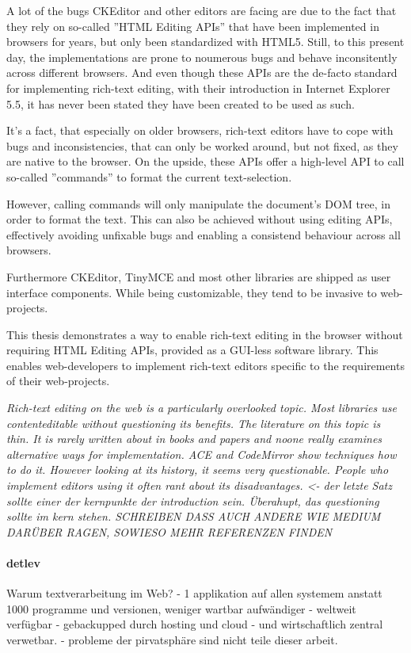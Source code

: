 A lot of the bugs CKEditor and other editors are facing are due to the fact that they rely on so-called ''HTML Editing APIs'' that have been implemented in browsers for years, but only been standardized with HTML5. Still, to this present day, the implementations are prone to noumerous bugs and behave inconsitently across different browsers. And even though these APIs are the de-facto standard for implementing rich-text editing, with their introduction in Internet Explorer 5.5, it has never been stated they have been created to be used as such.

It's a fact, that especially on older browsers, rich-text editors have to cope with bugs and inconsistencies, that can only be worked around, but not fixed, as they are native to the browser. On the upside, these APIs offer a high-level API to call so-called ''commands'' to format the current text-selection. 

However, calling commands will only manipulate the document's DOM tree, in order to format the text. This can also be achieved without using editing APIs, effectively avoiding unfixable bugs and enabling a consistend behaviour across all browsers.

Furthermore CKEditor, TinyMCE and most other libraries are shipped as user interface components. While being customizable, they tend to be invasive to web-projects.

This thesis demonstrates a way to enable rich-text editing in the browser without requiring HTML Editing APIs, provided as a GUI-less software library. This enables web-developers to implement rich-text editors specific to the requirements of their web-projects.

\textit{Rich-text editing on the web is a particularly overlooked topic. Most libraries use contenteditable without questioning its benefits. The literature on this topic is thin. It is rarely written about in books and papers and noone really examines alternative ways for implementation. ACE and CodeMirror show techniques how to do it. However looking at its history, it seems very questionable. People who implement editors using it often rant about its disadvantages. <- der letzte Satz sollte einer der kernpunkte der introduction sein. Überahupt, das questioning sollte im kern stehen. SCHREIBEN DASS AUCH ANDERE WIE MEDIUM DARÜBER RAGEN, SOWIESO MEHR REFERENZEN FINDEN}

\paragraph{detlev} Warum textverarbeitung im Web? - 1 applikation auf allen systemem anstatt 1000 programme und versionen, weniger wartbar aufwändiger - weltweit verfügbar - gebackupped durch hosting und cloud - und wirtschaftlich zentral verwetbar. - probleme der pirvatsphäre sind nicht teile dieser arbeit.


